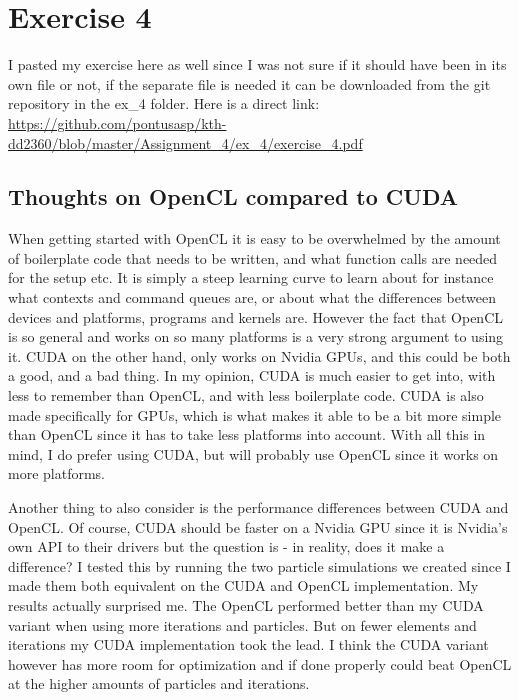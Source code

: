 \documentclass[a4paper, 12pt]{article}
\begin{document}
\newpage
\section{Exercise 4}
I pasted my exercise here as well since I was not sure if it should have been in its own file or not, if the separate file is needed it can be downloaded from the git repository in the ex\_4 folder. Here is a direct link: \url{https://github.com/pontusasp/kth-dd2360/blob/master/Assignment_4/ex_4/exercise_4.pdf}
\subsection{Thoughts on OpenCL compared to CUDA}
When getting started with OpenCL it is easy to be overwhelmed by the amount of boilerplate code that needs to be written, and what function calls are needed for the setup etc. It is simply a steep learning curve to learn about for instance what contexts and command queues are, or about what the differences between devices and platforms, programs and kernels are. However the fact that OpenCL is so general and works on so many platforms is a very strong argument to using it. CUDA on the other hand, only works on Nvidia GPUs, and this could be both a good, and a bad thing. In my opinion, CUDA is much easier to get into, with less to remember than OpenCL, and with less boilerplate code. CUDA is also made specifically for GPUs, which is what makes it able to be a bit more simple than OpenCL since it has to take less platforms into account. With all this in mind, I do prefer using CUDA, but will probably use OpenCL since it works on more platforms.

Another thing to also consider is the performance differences between CUDA and OpenCL. Of course, CUDA should be faster on a Nvidia GPU since it is Nvidia's own API to their drivers but the question is - in reality, does it make a difference? I tested this by running the two particle simulations we created since I made them both equivalent on the CUDA and OpenCL implementation. My results actually surprised me. The OpenCL performed better than my CUDA variant when using more iterations and particles. But on fewer elements and iterations my CUDA implementation took the lead. I think the CUDA variant however has more room for optimization and if done properly could beat OpenCL at the higher amounts of particles and iterations. 

\end{document}
